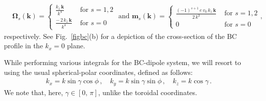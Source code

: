 \documentclass[aps,prb,onecolumn,nofootinbib,citeautoscript,10pt]{revtex4-2}
\begin{document}
\begin{align} 
\label{eqbcommhopf}
& {\boldsymbol \Omega}_s( \boldsymbol k)  = \begin{cases}
\frac{k_z\,\boldsymbol k  } {k^4} &\text{ for } s=1, 2\\
\frac{  - \,2\, k_z\,\boldsymbol k  } {k^4} & \text{ for } s=0
\end{cases}
\text{ and }
{\boldsymbol m}_s( \boldsymbol k)  = \begin{cases}
\frac{(-1)^{s+1} \,e\, v_0\, k_z\,\boldsymbol k  } {2\, k^3} &\text{ for } s=1, 2\\
0 &\text{ for } s=0
\end{cases} ,
\end{align}
respectively.
See Fig.~\ref{figbc}(b) for a depiction of the cross-section of the BC profile in the $k_x = 0$ plane.

While performing various integrals for the BC-dipole system, we will resort to using the usual spherical-polar coordinates, defined as follows:
\begin{align}
\label{eqtrs2}
k_x = k \sin \gamma \cos \phi  \,, \quad
k_y = k \sin \gamma  \sin \phi \,,\quad
k_z = k \cos \gamma \,.
\end{align}
We note that, here, $\gamma \in [0, \,\pi]$, unlike the toroidal coordinates.
\end{document}
